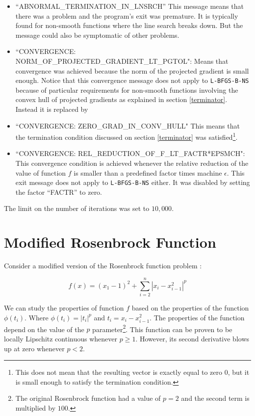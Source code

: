 \begin{itemize}

\item ``ABNORMAL\_TERMINATION\_IN\_LNSRCH'' This message means that there was a problem and the program's exit was premature. It is typically found for non-smooth functions where the line search breaks down. But the message could also be symptomatic of other problems.

\item ``CONVERGENCE: NORM\_OF\_PROJECTED\_GRADIENT\_LT\_PGTOL": Means that convergence was achieved because the norm of the projected gradient is small enough. Notice that this convergence message does not apply to \texttt{L-BFGS-B-NS} because of particular requirements for non-smooth functions involving the convex hull of projected gradients as explained in section \ref{terminator}. Instead it is replaced by

\item ``CONVERGENCE: ZERO\_GRAD\_IN\_CONV\_HULL" This means that the termination condition discussed on section \ref{terminator} was satisfied\footnote{This does not mean that the resulting vector is exactly equal to zero $0$, but it is small enough to satisfy the termination condition.}.

\item ``CONVERGENCE: REL\_REDUCTION\_OF\_F\_LT\_FACTR*EPSMCH": This convergence condition is achieved whenever the relative reduction of the value of function $f$ is smaller than a predefined factor times machine $\epsilon$. This exit message does not apply to \texttt{L-BFGS-B-NS} either. It was disabled by setting the factor ``FACTR'' to zero.

\end{itemize}

The limit on the number of iterations was set to $10,000$.

\section{Modified Rosenbrock Function} \label{ros}

Consider a modified version of the Rosenbrock function problem \citep{rosenbrock}:

\begin{equation} \label{modifiedrosenbrock}
    f(x) = (x_1 - 1)^2 + \sum_{i = 2}^n |x_i - x_{i - 1}^2|^p
\end{equation}

We can study the properties of function $f$ based on the properties of the function $\phi(t_i)$. Where $\phi(t_i) = |t_i|^p$ and $t_i = x_i - x_{i - 1}^2$. The properties of the function depend on the value of the $p$ parameter\footnote{The original Rosenbrock function had a value of $p = 2$ and the second term is multiplied by $100$.}. This function can be proven to be locally Lipschitz continuous whenever $p \geq 1$. However, its second derivative blows up at zero whenever $p < 2$.

